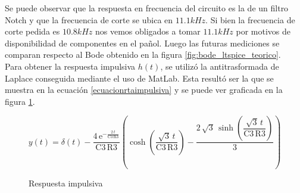 Se puede observar que la respuesta en frecuencia del circuito es la de un filtro Notch y que la frecuencia de corte se ubica en $11.1kHz$. Si
bien la frecuencia de corte pedida es $10.8kHz$ nos vemos obligados a tomar $11.1kHz$ por motivos de disponibilidad de componentes
en el pañol. Luego las futuras mediciones se comparan respecto al Bode obtenido en la figura \ref{fig:bode_ltspice_teorico}. \\

Para obtener la respuesta impulsiva $h(t)$, se utilizó la antitrasformada de Laplace conseguida mediante el uso de MatLab. Esta resultó ser la que se muestra en la ecuación \ref{ecuacionrtaimpulsiva} y se puede ver graficada en la figura \ref{respuestaimpulsiva}.

\begin{equation}
y \! \left(t\right) = \delta \! \left(t\right) - \dfrac{4\, \mathrm{e}^{-\frac{2\, t}{\mathrm{C3}\, \mathrm{R3}}}} {\mathrm{C3}\, \mathrm{R3}} \left(\cosh\!\left(\dfrac{\sqrt{3}\, t}{\mathrm{C3}\, \mathrm{R3}}\right) - \dfrac{2\, \sqrt{3}\, \sinh\!\left(\dfrac{\sqrt{3}\, t}{\mathrm{C3}\, \mathrm{R3}}\right)}{3}\right)
\label{ecuacionrtaimpulsiva}
\end{equation}

\begin{figure}[H] 
\begin{center}
\caption{Respuesta impulsiva}
\label{respuestaimpulsiva}
\end{center}
\end{figure}





